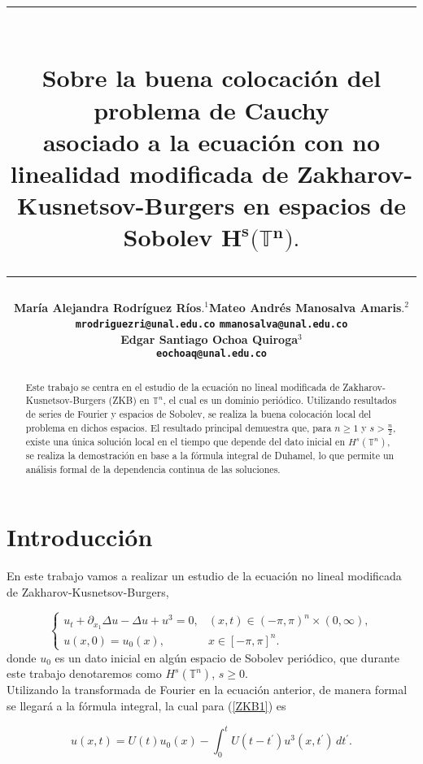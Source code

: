 \documentclass[12pt]{article}
\title{\vspace{-2cm}\par\noindent\rule{16cm}{1pt}\large
\\\bfseries Sobre la buena colocación del problema de Cauchy \\
asociado a la ecuación con no linealidad modificada de Zakharov-Kusnetsov-Burgers en espacios de Sobolev $\mathbf{H^s}\pmb{(}\pmb{\mathbb{T}}\mathbf{^n}\pmb{)}.$
\vspace{-0.34cm}\par\noindent\hspace{0.15cm}\rule{16cm}{1pt}
\vspace{-0.6cm}
}
\author{\small \bfseries María Alejandra Rodríguez Ríos$.^1$\quad \quad\small Mateo Andrés Manosalva Amaris$.^{2}$\\ \small \quad \texttt{mrodriguezri@unal.edu.co} \quad \quad \quad \quad \quad \quad \texttt{mmanosalva@unal.edu.co}\quad\quad \quad\\ \small \bfseries Edgar Santiago Ochoa Quiroga$^{3}$\\
\small \texttt{eochoaq@unal.edu.co}
}
\newcommand\T{\mathbb{T}}
\begin{document}
\nocite{grafakos2008classical}\nocite{ogrianoc}\nocite{iorio2001fourier}\nocite{ioriojunior2001equacoes}

\maketitle
\begin{abstract}
Este trabajo se centra en el estudio de la ecuación no lineal modificada de Zakharov-Kusnetsov-Burgers (ZKB) en $\T^n$, el cual es un dominio periódico. Utilizando resultados de series de Fourier y espacios de Sobolev, se realiza la buena colocación local del problema en dichos espacios. El resultado principal demuestra que, para $n \geq 1$ y $s > \frac{n}{2}$, existe una única solución local en el tiempo que depende del dato inicial en $H^s(\mathbb{T}^n)$, se realiza la demostración en base a la fórmula integral de Duhamel, lo que permite un análisis formal de la dependencia continua de las soluciones.
\end{abstract}

\section{Introducción}
En este trabajo vamos a realizar un estudio de la ecuación no lineal modificada de Zakharov-Kusnetsov-Burgers,

\begin{equation}\label{ZKB1}
    \begin{cases}
    u_t+\partial_{x_1}\Delta u-\Delta u+u^3=0, & (x,t)\in(-\pi,\pi)^n\times(0,\infty),\\
    u(x,0)=u_0(x), & x\in[-\pi,\pi]^n.
\end{cases}
\end{equation}
donde $u_0$ es un dato inicial en algún espacio de Sobolev periódico, que durante este trabajo denotaremos como $H^s(\mathbb{T}^n)$, $s \geq 0$. \\

Utilizando la transformada de Fourier en la ecuación anterior, de manera formal  se llegará a la fórmula integral, la cual para (\ref{ZKB1}) es 

\begin{equation*}\label{Duhamel}
u(x,t)=U(t)u_0(x)-\int_0^tU(t-t^\prime)u^3(x,t^\prime)\,dt^\prime.
\end{equation*}
      
\end{document}
